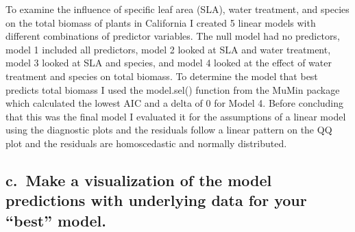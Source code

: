 \documentclass[
  letterpaper,
  DIV=11,
  numbers=noendperiod]{scrartcl}
\begin{document}
To examine the influence of specific leaf area (SLA), water treatment,
and species on the total biomass of plants in California I created 5
linear models with different combinations of predictor variables. The
null model had no predictors, model 1 included all predictors, model 2
looked at SLA and water treatment, model 3 looked at SLA and species,
and model 4 looked at the effect of water treatment and species on total
biomass. To determine the model that best predicts total biomass I used
the model.sel() function from the MuMin package which calculated the
lowest AIC and a delta of 0 for Model 4. Before concluding that this was
the final model I evaluated it for the assumptions of a linear model
using the diagnostic plots and the residuals follow a linear pattern on
the QQ plot and the residuals are homoscedastic and normally
distributed.

\subsection{c.~Make a visualization of the model predictions with
underlying data for your ``best''
model.}\label{c.-make-a-visualization-of-the-model-predictions-with-underlying-data-for-your-best-model.}
\end{document}
